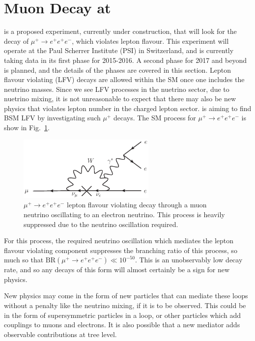 \section{Muon Decay at \mueee}
\label{sec:mu3e_experiment}
\mueee \cite{Blondel:2013ia} is a proposed experiment, currently under construction, that will look for the decay of $\mu^+ \rightarrow e^+ e^+ e^-$, which violates lepton flavour.
This experiment will operate at the Paul Scherrer Institute (PSI) in Switzerland, and is currently taking data in its first phase for 2015-2016.
A second phase for 2017 and beyond is planned, and the details of the phases are covered in this section. 
Lepton flavour violating (LFV) decays are allowed within the SM once one includes the neutrino masses.
Since we see LFV processes in the nuetrino sector, due to nuetrino mixing, it is not unreasonable to expect that there may also be new physics that violates lepton number in the charged lepton sector.
\mueee is aiming to find BSM LFV by investigating such $\mu^+$ decays.
The SM process for $\mu^+ \rightarrow e^+ e^+ e^-$ is show in Fig.\ \ref{fig:mu_eee_SM}.
\begin{figure}[h]
    \centering
    \includegraphics[width = 0.6\textwidth]{Figures/feynman_diagrams/mu_eee_SM.eps}
    \caption{$\mu^+ \rightarrow e^+ e^+ e^-$ lepton flavour violating decay through a muon neutrino oscillating to an electron neutrino. This process is heavily suppressed due to the neutrino oscillation required.}
    \label{fig:mu_eee_SM}
\end{figure}
For this process, the required neutrino oscillation which mediates the lepton flavour violating component suppresses the branching ratio of this process, so much so that $\textrm{BR}(\mu^+ \rightarrow e^+ e^+ e^-) \ll 10^{-50}$.
This is an unobservably low decay rate, and so any decays of this form will almost certainly be a sign for new physics.

New physics may come in the form of new particles that can mediate these loops without a penalty like the neutrino mixing, if it is to be observed.
This could be in the form of supersymmetric particles in a loop, or other particles which add couplings to muons and electrons.
It is also possible that a new mediator adds observable contributions at tree level.

